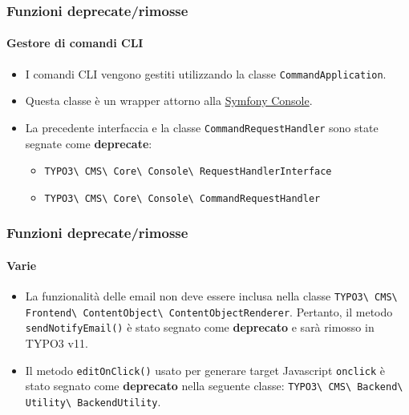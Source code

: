 \begin{frame}[fragile]
	\frametitle{Funzioni deprecate/rimosse}
	\framesubtitle{Gestore di comandi CLI}

	\begin{itemize}
		\item I comandi CLI vengono gestiti utilizzando la classe \texttt{CommandApplication}.
		\item Questa classe è un wrapper attorno alla
			\href{https://symfony.com/doc/current/components/console.html}{Symfony Console}.

		\item La precedente interfaccia e la classe \texttt{CommandRequestHandler} sono state segnate come \textbf{deprecate}:

			\begin{itemize}
				\item
					\texttt{TYPO3\textbackslash
						CMS\textbackslash
						Core\textbackslash
						Console\textbackslash
						RequestHandlerInterface}
				\item
					\texttt{TYPO3\textbackslash
						CMS\textbackslash
						Core\textbackslash
						Console\textbackslash
						CommandRequestHandler}
			\end{itemize}

	\end{itemize}

\end{frame}


\begin{frame}[fragile]
	\frametitle{Funzioni deprecate/rimosse}
	\framesubtitle{Varie}

	\begin{itemize}
		\item La funzionalità delle email non deve essere inclusa nella classe\newline
			\small
				\texttt{TYPO3\textbackslash
					CMS\textbackslash
					Frontend\textbackslash
					ContentObject\textbackslash
					ContentObjectRenderer}.\newline
			\normalsize
			Pertanto, il metodo \texttt{sendNotifyEmail()} è stato segnato come \textbf{deprecato} e sarà rimosso in TYPO3 v11.

		\item Il metodo \texttt{editOnClick()} usato per generare target Javascript \texttt{onclick}
			è stato segnato come \textbf{deprecato} nella seguente classe:\newline
			\small
				\texttt{TYPO3\textbackslash
					CMS\textbackslash
					Backend\textbackslash
					Utility\textbackslash
					BackendUtility}.
			\normalsize

	\end{itemize}

\end{frame}

